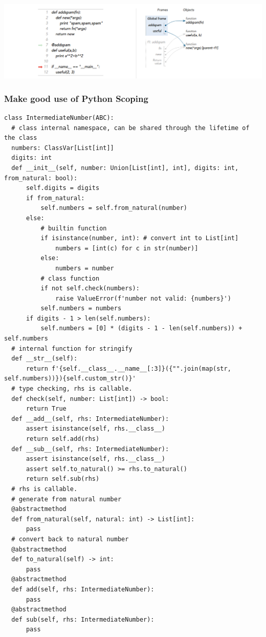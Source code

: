 \documentclass[a4paper]{exam}
\begin{document}
\includegraphics[width=15cm]{./img/decorator.png}



\subsubsection{Make good use of Python Scoping}
\begin{verbatim}
class IntermediateNumber(ABC):
  # class internal namespace, can be shared through the lifetime of the class
  numbers: ClassVar[List[int]]
  digits: int
  def __init__(self, number: Union[List[int], int], digits: int, from_natural: bool):
      self.digits = digits
      if from_natural:
          self.numbers = self.from_natural(number)
      else:
          # builtin function
          if isinstance(number, int): # convert int to List[int]
              numbers = [int(c) for c in str(number)]
          else:
              numbers = number
          # class function
          if not self.check(numbers):
              raise ValueError(f'number not valid: {numbers}')
          self.numbers = numbers
      if digits - 1 > len(self.numbers):
          self.numbers = [0] * (digits - 1 - len(self.numbers)) + self.numbers
  # internal function for stringify
  def __str__(self):
      return f'{self.__class__.__name__[:3]}({"".join(map(str, self.numbers))}){self.custom_str()}'
  # type checking, rhs is callable.
  def check(self, number: List[int]) -> bool:
      return True
  def __add__(self, rhs: IntermediateNumber):
      assert isinstance(self, rhs.__class__)
      return self.add(rhs)
  def __sub__(self, rhs: IntermediateNumber):
      assert isinstance(self, rhs.__class__)
      assert self.to_natural() >= rhs.to_natural()
      return self.sub(rhs)
  # rhs is callable.
  # generate from natural number
  @abstractmethod
  def from_natural(self, natural: int) -> List[int]:
      pass
  # convert back to natural number
  @abstractmethod
  def to_natural(self) -> int:
      pass
  @abstractmethod
  def add(self, rhs: IntermediateNumber):
      pass
  @abstractmethod
  def sub(self, rhs: IntermediateNumber):
      pass
\end{verbatim}
\end{document}
